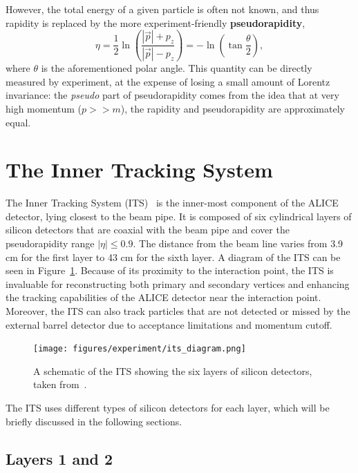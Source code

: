 However, the total energy of a given particle is often not known, and thus rapidity is replaced by the more experiment-friendly \textbf{pseudorapidity}, 
\begin{equation}
    \eta = \frac{1}{2} \ln \left( \frac{|\vec{p}| + p_{z}}{|\vec{p}| - p_{z}} \right) 
        = -\ln \left( \tan \frac{\theta}{2} \right),
\end{equation}
where $\theta$ is the aforementioned polar angle. This quantity can be directly measured by experiment, at the expense of losing a small amount of Lorentz invariance: the \textit{pseudo} part of pseudorapidity comes from the idea that at very high momentum ($p >> m$), the rapidity and pseudorapidity are approximately equal.

\section{The Inner Tracking System}

The Inner Tracking System (ITS)~\cite{ITS} is the inner-most component of the ALICE detector, lying closest to the beam pipe. It is composed of six cylindrical layers of silicon detectors that are coaxial with the beam pipe and cover the pseudorapidity range $|\eta| \leq 0.9$. The distance from the beam line varies from 3.9 cm for the first layer to 43 cm for the sixth layer. A diagram of the ITS can be seen in Figure~\ref{fig:its_schematic}. Because of its proximity to the interaction point, the ITS is invaluable for reconstructing both primary and secondary vertices and enhancing the tracking capabilities of the ALICE detector near the interaction point. Moreover, the ITS can also track particles that are not detected or missed by the external barrel detector due to acceptance limitations and momentum cutoff. 

\begin{figure}
    \centering
    \texttt{[image: figures/experiment/its\_diagram.png]}
    \caption{A schematic of the ITS showing the six layers of silicon detectors, taken from~\cite{ITSDiagram}.}
    \label{fig:its_schematic}
\end{figure}

The ITS uses different types of silicon detectors for each layer, which will be briefly discussed in the following sections.

\subsection{Layers 1 and 2}

